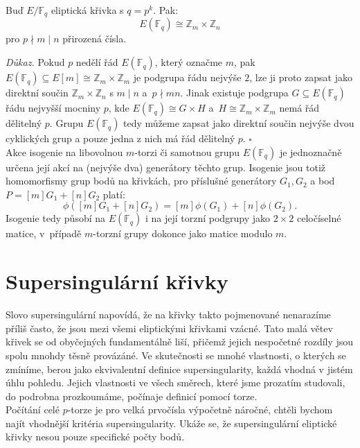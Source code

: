\documentclass [12pt]{report}
\begin{document}
\begin{veta}
Buď $E/\mathbb{F}_q$ eliptická křivka s $q = p^k$. Pak:
\begin{equation*}
E(\mathbb{F}_q) \cong \mathbb{Z}_m \times \mathbb{Z}_n
\end{equation*}
pro $p \nmid m \mid n$ přirozená čísla.
\end{veta}
\noindent \textit{Důkaz.} Pokud $p$ nedělí řád $E(\mathbb{F}_q)$, který označme $m$, pak $E(\mathbb{F}_q) \subseteq E[m] \cong \mathbb{Z}_m \times \mathbb{Z}_m$ je podgrupa řádu nejvýše $2$, lze ji proto zapsat jako direktní součin $\mathbb{Z}_m \times \mathbb{Z}_n$ s $m \mid n$ a~$p \nmid mn$. Jinak existuje podgrupa $G \subseteq E(\mathbb{F}_q)$ řádu nejvyšší mocniny $p$, kde $E(\mathbb{F}_q) \cong G \times H$ a~$H \cong \mathbb{Z}_m \times \mathbb{Z}_m$ nemá řád dělitelný $p$. Grupu $E(\mathbb{F}_q)$ tedy můžeme zapsat jako direktní součin nejvýše dvou cyklických grup a pouze jedna z nich má řád dělitelný $p$. \hfill $\square$\\

Akce isogenie na libovolnou $m$-torzi či samotnou grupu $E(\mathbb{F}_q)$ je jednoznačně určena její akcí na (nejvýše dva) generátory těchto grup. Isogenie jsou totiž homomorfismy grup bodů na křivkách, pro příslušné generátory $G_1,G_2$ a bod $P = [m] G_1 + [n] G_2$ platí:
\begin{equation*}
\phi([m]G_1+[n]G_2) = [m] \phi (G_1 )+ [n] \phi (G_2).
\end{equation*}
Isogenie tedy působí na $E(\mathbb{F}_q)$ i na její torzní podgrupy jako $2 \times 2$ celočíselné matice, v~případě $m$-torzní grupy dokonce jako matice modulo $m$. 

\section{Supersingulární křivky}

Slovo supersingulární napovídá, že na křivky takto pojmenované nenarazíme příliš často, že jsou mezi všemi eliptickými křivkami vzácné. Tato malá větev křivek se od obyčejných fundamentálně liší, přičemž jejich nespočetné rozdíly jsou spolu mnohdy těsně provázáné. Ve skutečnosti se mnohé vlastnosti, o kterých se zmíníme, berou jako ekvivalentní definice supersingularity, každá vhodná v jistém úhlu pohledu. Jejich vlastnosti ve všech směrech, které jsme prozatím studovali, do podrobna prozkoumáme, počínaje definicí pomocí torze.\\

Počítání celé $p$-torze je pro velká prvočísla výpočetně náročné, chtěli bychom najít vhodnější kritéria supersingularity. Ukáže se, že supersingulární eliptické křivky nesou pouze specifické počty bodů.
\end{document}
